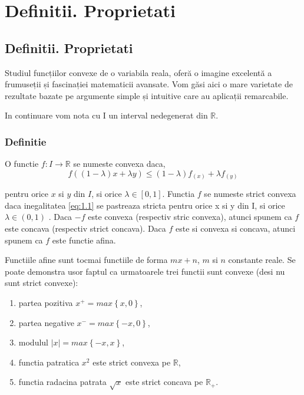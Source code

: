 \documentclass[a4paper,12pt,oneside]{report}
\begin{document}
\maketitle

\tableofcontents

%
%
%
%
\chapter{Definitii. Proprietati}

\section{Definitii. Proprietati}

Studiul funcțiilor convexe de o variabila reala, oferă o imagine excelentă a frumuseții și fascinației matematicii avansate. Vom găsi aici o mare varietate de rezultate bazate pe argumente simple și intuitive care au aplicații remarcabile.

In continuare vom nota cu I un interval nedegenerat din \(\mathbb{R}\).

\subsection{Definitie}

O functie \(f: I \rightarrow \mathbb{R}\) se numeste convexa daca,
\begin{displaymath}
f \left ( \left ( 1 - \lambda  \right )x + \lambda y \right )\leq \left ( 1 - \lambda  \right ) f_{\left ( x \right )} + \lambda f_{\left ( y \right )} 	\label{eq:1.1} \tag{1.1}
\end{displaymath}

pentru orice \(x\) si \(y\) din \(I\), si orice \(\lambda \in \left [ 0,1 \right ]\). Functia \(f\) se numeste strict convexa daca inegalitatea \ref{eq:1.1} se pastreaza  stricta pentru orice x si y din I, si orice  \(\lambda \in \left ( 0,1 \right )\) . Daca \(-f\) este convexa (respectiv stric convexa), atunci spunem ca \(f\) este concava (respectiv strict concava). Daca \(f\) este si convexa si concava, atunci spunem ca \(f\) este functie afina. 


Functiile afine sunt tocmai functiile de forma \(mx + n\),  \(m\) si \(n\) constante reale.
Se poate demonstra usor faptul ca urmatoarele trei functii sunt convexe (desi nu sunt strict convexe):
\begin{enumerate}
  \item partea pozitiva \(x^{+} = max \left \{ x,0 \right \}\),
  \item partea negative \(x^{-} = max \left \{ -x,0 \right \}\), 
  \item modulul \(\left | x \right | = max \left \{ -x,x \right \}\),
  \item functia patratica \(x^{2}\)  este strict convexa pe \(\mathbb{R}\),
  \item functia radacina patrata \(\sqrt{x}\) este strict concava pe \(\mathbb{R}_{+}\). 
\end{enumerate}
\end{document}
